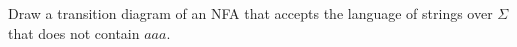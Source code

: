 Draw a transition diagram of an NFA that accepts the language of
strings over $\Sigma$ that does not contain $aaa$.
\vspace{2in}
